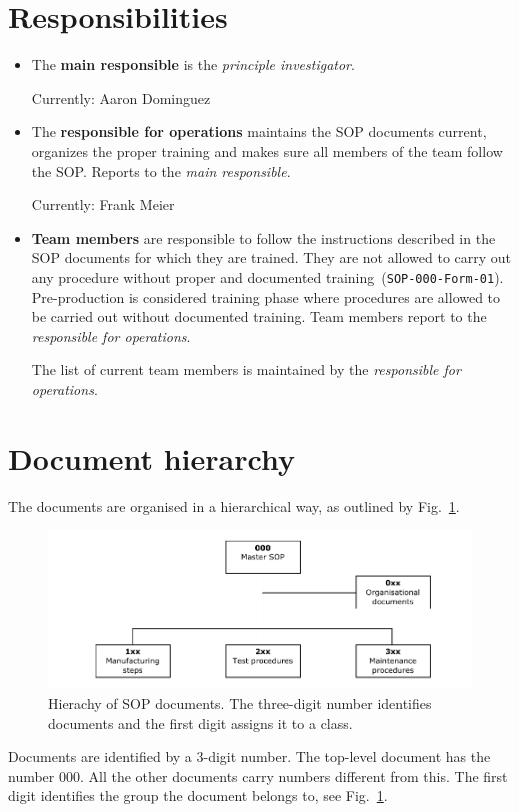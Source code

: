 \documentclass[12pt]{unlsilabsop}
\begin{document}
\section{Responsibilities}
\begin{itemize}
    \item The \textbf{main responsible} is the \emph{principle investigator}.

    Currently: Aaron Dominguez
    \item The \textbf{responsible for operations} maintains the SOP documents current, organizes the proper training and makes sure all members of the team follow the SOP. Reports to the \emph{main responsible}.

    Currently: Frank Meier
    \item \textbf{Team members} are responsible to follow the instructions described in the SOP documents for which they are trained. They are not allowed to carry out any procedure without proper and documented training~(\texttt{SOP-000-Form-01}). Pre-production is considered training phase where procedures are allowed to be carried out without documented training. Team members report to the \emph{responsible for operations}.

    The list of current team members is maintained by the \emph{responsible for operations}.
\end{itemize}


\section{Document hierarchy}
The documents are organised in a hierarchical way, as outlined by Fig.~\ref{fig:SOPhierarchy}.
\begin{figure}[h]
    \begin{center}
        \includegraphics[width=16cm]{img/SOPhierarchy.pdf}
        \caption{Hierachy of SOP documents. The three-digit number identifies documents and the first digit assigns it to a class.}
        \label{fig:SOPhierarchy}
    \end{center}
\end{figure}
Documents are identified by a 3-digit number. The top-level document has the number 000. All the other documents carry numbers different from this. The first digit identifies the group the document belongs to, see Fig.~\ref{fig:SOPhierarchy}.
\end{document}
